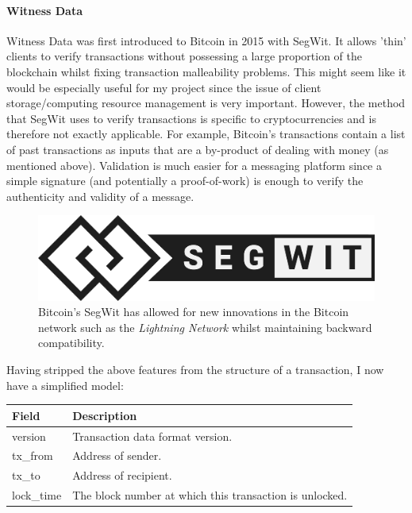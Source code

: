 \documentclass{article}
\begin{document}
\paragraph{Witness Data}
Witness Data was first introduced to Bitcoin in 2015 with SegWit\cite{bitcoin_segwit}. It allows 'thin' clients to verify transactions without possessing a large proportion of the blockchain whilst fixing transaction malleability problems. This might seem like it would be especially useful for my project since the issue of client storage/computing resource management is very important. However, the method that SegWit uses to verify transactions is specific to cryptocurrencies and is therefore not exactly applicable. For example, Bitcoin's transactions contain a list of past transactions as inputs that are a by-product of dealing with money (as mentioned above). Validation is much easier for a messaging platform since a simple signature (and potentially a proof-of-work) is enough to verify the authenticity and validity of a message.
\begin{figure}[ht]
    \centering
    \includegraphics[width=0.65\linewidth]{Images/Segwit.png}
    \caption{Bitcoin's SegWit has allowed for new innovations in the Bitcoin network such as the \textit{Lightning Network}\cite{bitcoin_lightning_network} whilst maintaining backward compatibility.}
    \label{fig:segwit}
\end{figure}
\newpage

Having stripped the above features from the structure of a transaction, I now have a simplified model:
\begin{table}[H]
\centering
\begin{tabular}{|l|p{8.5cm}|}
\hline
\rowcolor{tblgrey}
Field & Description \\ \hline
version     & Transaction data format version.                          \\ \hline
tx\_from    & Address of sender.                    \\ \hline
tx\_to      & Address of recipient.                                     \\ \hline
lock\_time  & The block number at which this transaction is unlocked. \\ \hline
\end{tabular}
\end{table}
\end{document}
